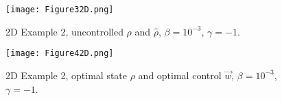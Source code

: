 
\begin{figure}[h]
	\texttt{[image: Figure32D.png]}
	\caption{2D Example 2, uncontrolled $\rho$ and $\widehat \rho$, $\beta = 10^{-3}$, $\gamma = -1$. }
	\label{rhoHat2dEx4}
\end{figure}
\begin{figure}[h]
	\texttt{[image: Figure42D.png]}
	\caption{2D Example 2, optimal state $\rho$ and optimal control $\vec{w}$, $\beta = 10^{-3}$, $\gamma = -1$.}
	\label{rhoOpt2dEx4}
\end{figure}







